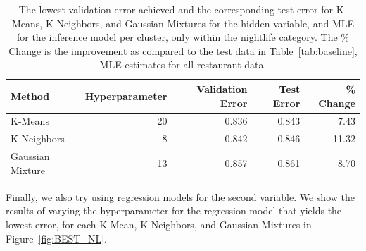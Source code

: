 \documentclass[11pt]{article}
\begin{document}
\begin{table}[h!]
    \begin{tabularx}{1.0\textwidth}{| X | r | r | r | r |}
        \hline
        Method & Hyperparameter & Validation Error & Test Error & \% Change\\
        \hline
        K-Means &  20 & 0.836 & 0.843 & 7.43 \\
        K-Neighbors &  8 & 0.842 & 0.846 & 11.32 \\
        Gaussian Mixture & 13 & 0.857 & 0.861 & 8.70 \\
        \hline
    \end{tabularx}
    \caption{The lowest validation error achieved and the corresponding test error for K-Means, K-Neighbors, and Gaussian Mixtures for the hidden variable, and MLE for the inference model per cluster, only within the nightlife category. The \% Change is the improvement as compared to the test data in Table~\ref{tab:baseline}, MLE estimates for all restaurant data.}
    \label{tab:baseline_NL}
\end{table}

Finally, we also try using regression models for the second variable. We show the results of varying the hyperparameter for the regression model that yields the lowest error, for each K-Mean, K-Neighbors, and Gaussian Mixtures in Figure~\ref{fig:BEST_NL}.
\end{document}
